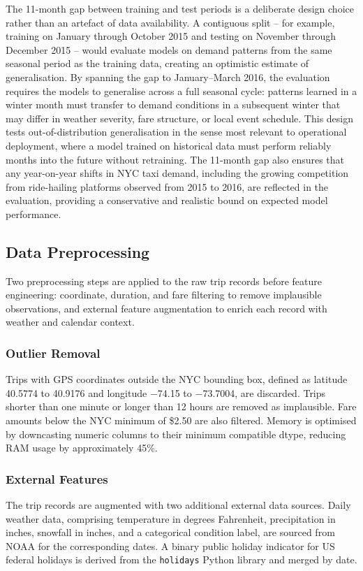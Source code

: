 \documentclass[a4paper,fleqn]{cas-dc}
\begin{document}
The 11-month gap between training and test periods is a deliberate design choice rather than an artefact of data availability.  A contiguous split -- for example, training on January through October 2015 and testing on November through December 2015 -- would evaluate models on demand patterns from the same seasonal period as the training data, creating an optimistic estimate of generalisation.  By spanning the gap to January--March 2016, the evaluation requires the models to generalise across a full seasonal cycle: patterns learned in a winter month must transfer to demand conditions in a subsequent winter that may differ in weather severity, fare structure, or local event schedule.  This design tests out-of-distribution generalisation in the sense most relevant to operational deployment, where a model trained on historical data must perform reliably months into the future without retraining.  The 11-month gap also ensures that any year-on-year shifts in NYC taxi demand, including the growing competition from ride-hailing platforms observed from 2015 to 2016, are reflected in the evaluation, providing a conservative and realistic bound on expected model performance.

\subsection{Data Preprocessing}

Two preprocessing steps are applied to the raw trip records before feature engineering: coordinate, duration, and fare filtering to remove implausible observations, and external feature augmentation to enrich each record with weather and calendar context.

\subsubsection{Outlier Removal}
Trips with GPS coordinates outside the NYC bounding box, defined as latitude 40.5774 to 40.9176 and longitude $-$74.15 to $-$73.7004, are discarded.  Trips shorter than one minute or longer than 12 hours are removed as implausible.  Fare amounts below the NYC minimum of \$2.50 are also filtered.  Memory is optimised by downcasting numeric columns to their minimum compatible dtype, reducing RAM usage by approximately 45\%.

\subsubsection{External Features}
The trip records are augmented with two additional external data sources.  Daily weather data, comprising temperature in degrees Fahrenheit, precipitation in inches, snowfall in inches, and a categorical condition label, are sourced from NOAA for the corresponding dates.  A binary public holiday indicator for US federal holidays is derived from the \texttt{holidays} Python library and merged by date.
\end{document}
